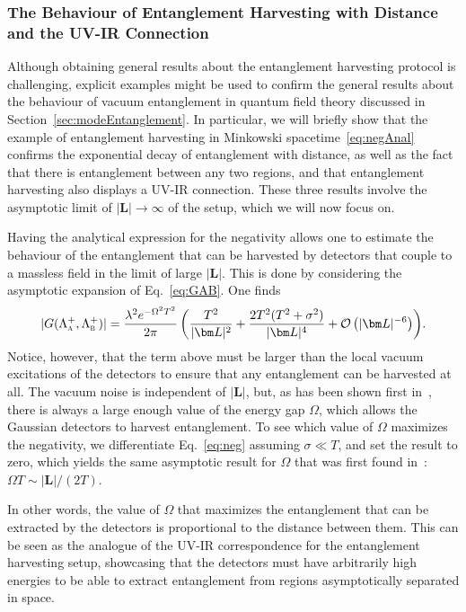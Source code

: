 \documentclass[letterpaper,12pt,titlepage,oneside,final]{book}
\newcommand{\tc}[1]{\textsc{#1}}
\begin{document}
\subsubsection*{The Behaviour of Entanglement Harvesting with Distance and the UV-IR Connection}


Although obtaining general results about the entanglement harvesting protocol is challenging, explicit examples might be used to confirm the general results about the behaviour of vacuum entanglement in quantum field theory discussed in Section~\ref{sec:modeEntanglement}. In particular, we will briefly show that the example of entanglement harvesting in Minkowski spacetime~\eqref{eq:negAnal} confirms the exponential decay of entanglement with distance, as well as the fact that there is entanglement between any two regions, and that entanglement harvesting also displays a UV-IR connection. These three results involve the asymptotic limit of $|\bm L|\to \infty$ of the setup, which we will now focus on.

Having the analytical expression for the negativity allows one to estimate the behaviour of the entanglement that can be harvested by detectors that couple to a massless field in the limit of large $|\bm L|$. This is done by considering the asymptotic expansion of Eq.~\eqref{eq:GAB}. One finds
\begin{equation}
    |G(\Lambda_\tc{a}^+,\Lambda_\tc{b}^+)| = \frac{\lambda^2e^{- \Omega^2 T^2}}{2\pi} \left(\frac{T^2}{|\bm L|^2} + \frac{2T^2(T^2+\sigma^2)}{|\bm L|^4}+ \mathcal{O}\left(|\bm L|^{-6}\right)\right)\!.
\end{equation}
Notice, however, that the term above must be larger than the local vacuum excitations of the detectors to ensure that any entanglement can be harvested at all. The vacuum noise is independent of $|\bm L|$, but, as has been shown first in~\cite{hectorMass}, there is always a large enough value of the energy gap $\Omega$, which allows the Gaussian detectors to harvest entanglement. To see which value of $\Omega$ maximizes the negativity, we differentiate Eq.~\eqref{eq:neg} assuming $\sigma\ll T$, and set the result to zero, which yields the same asymptotic result for $\Omega$ that was first found in~\cite{hectorMass}: $\Omega T \sim | \bm L|/(2T)$. 

In other words, the value of $\Omega$ that maximizes the entanglement that can be extracted by the detectors is proportional to the distance between them. This can be seen as the analogue of the UV-IR correspondence for the entanglement harvesting setup, showcasing that the detectors must have arbitrarily high energies to be able to extract entanglement from regions asymptotically separated in space.
\end{document}
